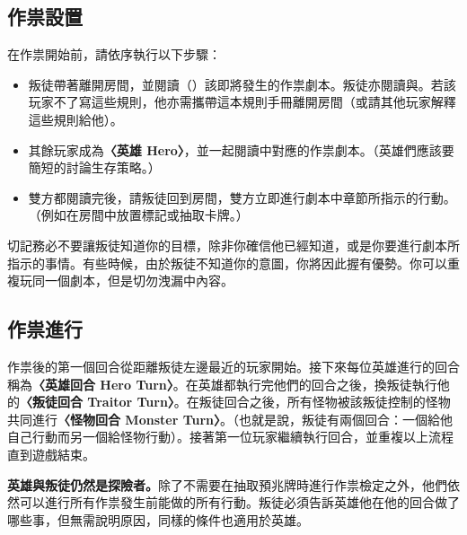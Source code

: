 
\subsection{作祟設置} \label{ssec:haunt-setup}

在作祟開始前，請依序執行以下步驟：

\begin{itemize}
  \item 叛徒帶著離開房間，並閱讀（）該即將發生的作祟劇本。叛徒亦閱讀與。若該玩家不了寫這些規則，他亦需攜帶這本規則手冊離開房間（或請其他玩家解釋這些規則給他）。
  \item 其餘玩家成為\textbf{〈英雄 Hero〉}，並一起閱讀中對應的作祟劇本。（英雄們應該要簡短的討論生存策略。）
  \item 雙方都閱讀完後，請叛徒回到房間，雙方立即進行劇本中章節所指示的行動。（例如在房間中放置標記或抽取卡牌。）
\end{itemize}

\begin{RuleBox}{}
  切記務必不要讓叛徒知道你的目標，除非你確信他已經知道，或是你要進行劇本所指示的事情。有些時候，由於叛徒不知道你的意圖，你將因此握有優勢。你可以重複玩同一個劇本，但是切勿洩漏中內容。
\end{RuleBox}


\subsection{作祟進行} \label{ssec:playing-the-hanut}

作祟後的第一個回合從距離叛徒左邊最近的玩家開始。接下來每位英雄進行的回合稱為\textbf{〈英雄回合 Hero Turn〉}。在英雄都執行完他們的回合之後，換叛徒執行他的\textbf{〈叛徒回合 Traitor Turn〉}。在叛徒回合之後，所有怪物被該叛徒控制的怪物共同進行\textbf{〈怪物回合 Monster Turn〉}。（也就是說，叛徒有兩個回合：一個給他自己行動而另一個給怪物行動）。接著第一位玩家繼續執行回合，並重複以上流程直到遊戲結束。

\textbf{英雄與叛徒仍然是探險者。}除了不需要在抽取預兆牌時進行作祟檢定之外，他們依然可以進行所有作祟發生前能做的所有行動。叛徒必須告訴英雄他在他的回合做了哪些事，但無需說明原因，同樣的條件也適用於英雄。

